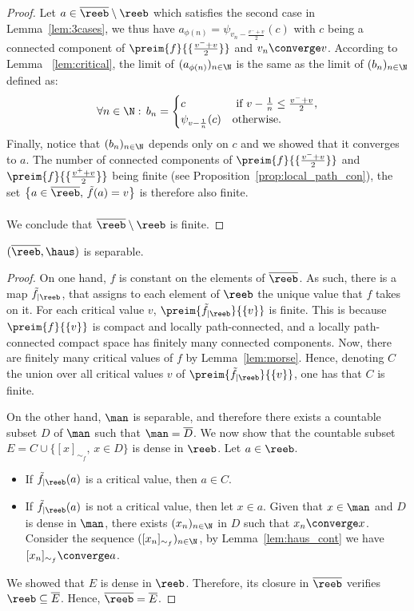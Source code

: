 \begin{proof}
 
Let $a\in\overline{\reeb}\setminus\reeb$ which satisfies the second case in Lemma~\ref{lem:3cases}, we thus have $a_{\phi(n)}=\psi_{v_n-\frac{v^-+v}{2}}(c)$ with $c$ being a connected component of $\preim{f}{\{\frac{v^-+v}{2}\}}$ and $v_n\converge v$.  According to Lemma ~\ref{lem:critical}, the limit of $(a_{\phi(n)})_{n\in\N}$ is the same as the limit of $(b_n)_{n\in\N}$ defined as:
$$\forall n\in\N:\,b_n=\begin{cases}
    c&\text{ if } v-\frac{1}{n}\leq\frac{v^-+v}{2},\\
    \psi_{v-\frac{1}{n}}(c)&\text{otherwise}.
\end{cases}$$
Finally, notice that $(b_n)_{n\in\N}$ depends only on $c$ and we showed that it converges to $a$. The number of connected components of $\preim{f}{\{\frac{v^-+v}{2}\}}$ and $\preim{f}{\{\frac{v^++v}{2}\}}$ being finite (see Proposition~\ref{prop:local_path_con}), the set $\left\{a\in\overline{\reeb},\,\Tilde{f}(a)=v\right\}$ is therefore also finite.\\\\
We conclude that $\overline{\reeb}\setminus\reeb$ is finite.
\end{proof}


\begin{proposition}\label{prop:reeb_sep}$(\overline{\reeb},\haus)$ is separable.
\end{proposition}


\begin{proof}
On one hand, $f$ is constant on the elements of $\overline{\reeb}$. As such, there is a map $\Tilde{f}_{|\reeb}$, that assigns to each element of $\reeb$ the unique value that $f$ takes on it. 
For each critical value $v$, $\preim{\Tilde{f}_{|\reeb}}{\{v\}}$ is finite. This is because $\preim{f}{\{v\}}$ is compact  and locally path-connected, and a locally path-connected compact space has finitely many connected components. 
Now, there are finitely many critical values of $f$ by Lemma~\ref{lem:morse}. Hence, denoting $C$ the union over all critical values $v$ of $\preim{\Tilde{f}_{|\reeb}}{\{v\}}$, one has that $C$ is finite. 

On the other hand, $\man$ is separable, and therefore there exists a countable subset $D$ of $\man$ such that $\man=\overline{D}$. We now show that the countable subset $E=C\cup \{[x]_{\sim_f},\,x\in D\}$ is dense in $\reeb$. Let $a\in\reeb$. 
\begin{itemize}
	\item If $\Tilde{f}_{|\reeb}(a)$ is a critical value, then $a\in C$.
	\item If $\Tilde{f}_{|\reeb}(a)$ is not a critical value, then let $x\in a$. Given that $x\in\man$ and $D$ is dense in $\man$, there exists $(x_n)_{n\in\N}$ in $D$ such that $x_n\converge x$. Consider the sequence $([x_n]_{\sim_f})_{n\in\N}$, by Lemma~\ref{lem:haus_cont} we have $[x_n]_{\sim_f}\converge a$.
\end{itemize}  

We showed that $E$ is dense in $\reeb$. Therefore, its closure in $\overline{\reeb}$ verifies $\reeb\subseteq\overline{E}$. Hence, $\overline{\reeb}=\overline{E}$.

\end{proof}

